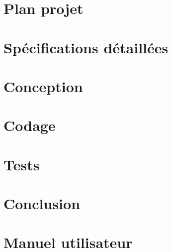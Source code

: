 \documentclass[12pt,a4paper,titlepage,openright]{report}
\begin{document}
    \renewcommand{\contentsname}{Sommaire}
    \tableofcontents


    \normalsize
    \part{ Plan projet}
    \setcounter{chapter}{0}
    \part{ Spécifications détaillées}
    \setcounter{chapter}{0}
    \part{ Conception}
    \setcounter{chapter}{0}
    \part{ Codage}
    \setcounter{chapter}{0}
    \part{ Tests}
    \setcounter{chapter}{0}
    

    \part{ Conclusion}
    \setcounter{chapter}{0}
    


    \appendix
    \part{Manuel utilisateur}
\end{document}
